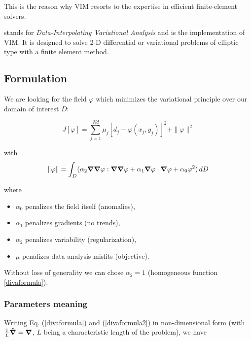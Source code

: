 This is the reason why VIM resorts to the expertise in efficient finite-element solvers.

\diva stands for \textit{Data-Interpolating Variational Analysis} and is the implementation of VIM. It is designed to solve 2-D differential or variational problems of elliptic type with a finite element method.


\subsection{Formulation\label{sec:formulation}}

We are looking for the field $\varphi$ which minimizes the variational principle over our domain of interest $D$:

\begin{equation}
J \left[\varphi\right] =\sum_{j=1}^{Nd}\mu_{j}\left[d_{j}-\varphi(x_{j},y_{j})\right]^{2}+
\| \varphi\| ^{2}
\label{divaformula}
\end{equation}

with
\begin{equation}
\|\varphi\|=\int_{D}(
\alpha_{2} 
\boldsymbol{\nabla}\boldsymbol{\nabla}\varphi : \boldsymbol{\nabla}\boldsymbol{\nabla}\varphi +\alpha_{1}
\boldsymbol{\nabla}\varphi \cdot \boldsymbol{\nabla}\varphi + \alpha_{0} \varphi^{2})\, d D
\label{divaformula2}
\end{equation}

where
\begin{itemize}
\item
$\alpha_0$ penalizes the field itself (anomalies),
\item
$\alpha_1$ penalizes gradients (no trends),
\item 
$\alpha_2$ penalizes variability (regularization),
\item 
$\mu$ penalizes data-analysis misfits (objective).
\end{itemize}
Without loss of generality we can chose $\alpha_2=1$ (homogeneous function \ref{divaformula}).



\subsubsection{Parameters meaning\label{sec:parammeaning}}

Writing Eq. (\ref{divaformula}) and (\ref{divaformula2}) in non-dimensional form (with $\frac{1}{L}\tilde{\boldsymbol{\nabla}}=\boldsymbol{\nabla}$, $L$ being a characteristic length of the problem), we have

